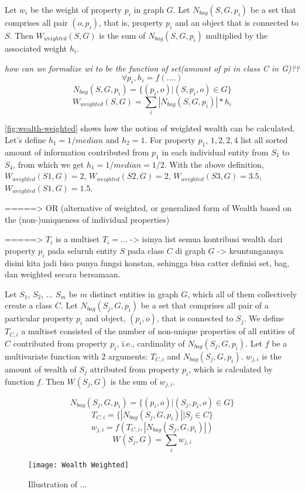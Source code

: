 Let \(w_i\) be the weight of property \(p_i\) in graph \(G\). Let \(N_{bag}(S,G,p_i)\) be a set that comprises all pair  \((o,p_i)\), that is, property \(p_i\) and an object that is connected to \(S\). Then \(W_{weighted}(S, G)\) is the sum of \(N_{bag}(S,G,p_i)\) multiplied by the associated weight \(h_i\).

\textit{how can we formalize wi to be the function of set(amount of pi in class C in G)??}
\[
    \forall p_i, h_i = f(....)
\]
\[
    N_{bag}(S,G,p_i) = \{(p_i, o) | (S, p_i, o) \in G\}
\]
\[
    W_{weighted}(S, G) = \sum_i |N_{bag}(S,G,p_i)| * h_i
\]

\autoref{fig:wealth-weighted} shows how the notion of weighted wealth can be calculated. Let's define \(h_1 = 1/median\) and \(h_2 = 1\). For property \(p_1\), \({1, 2, 2, 4}\) list all sorted amount of information contributed from \(p_1\) in each individual entity from \(S_1\) to \(S_4\), from which we get \(h_1 = 1/median = 1/2\). With the above definition, \(W_{weighted}(S1, G) = 2\), \(W_{weighted}(S2, G) = 2\), \(W_{weighted}(S3, G) = 3.5\), \(W_{weighted}(S1, G) = 1.5\).

=====> OR (alternative of weighted, or generalized form of Wealth based on the (non-)uniqueness of individual properties)

=====> \(T_i\) is a multiset \(T_i = ... \) -> isinya list semua kontribusi wealth dari property \(p_i\) pada seluruh entity \(S\) pada class \(C\) di graph \(G\) -> keuntungannya disini kita jadi bisa punya fungsi konstan, sehingga bisa catter definisi set, bag, dan weighted secara bersamaan.

Let \(S_1\), \(S_2\), ... \(S_m\) be \(m\) distinct entities in graph \(G\), which all of them collectively create a class \(C\). Let \(N_{bag}(S_j,G,p_i)\) be a set that comprises all pair of a particular property \(p_i\) and object, \((p_i,o)\), that is connected to \(S_j\). We define \(T_{C,i}\) a multiset consisted of the number of non-unique properties of all entities of \(C\) contributed from property \(p_i\), i.e., cardinality of \(N_{bag}(S_j,G,p_i)\). Let \(f\) be a multivariate function with 2 arguments: \(T_{C,i}\) and \(N_{bag}(S_j,G,p_i)\). \(w_{j,i}\) is the amount of wealth of \(S_j\) attributed from property \(p_i\), which is calculated by function \(f\). Then \(W_{}(S_j, G)\) is the sum of \(w_{j,i}\).


\[
    N_{bag}(S_j,G,p_i) = \{(p_i,o) | (S_j, p_i, o) \in G\}
\]
\[
    T_{C,i} = \{|N_{bag}(S_j,G,p_i)| | S_j \in C\}
\]
\[
    w_{j,i} = f(T_{C,i}, |N_{bag}(S_j,G,p_i)|)
\]
\[
    W_{}(S_j, G) = \sum_i w_{j,i}
\]

\begin{figure}
    \centering
    \texttt{[image: Wealth Weighted]}
    \caption{Illustration of ...}
    \label{fig:wealth-weighted}
\end{figure}